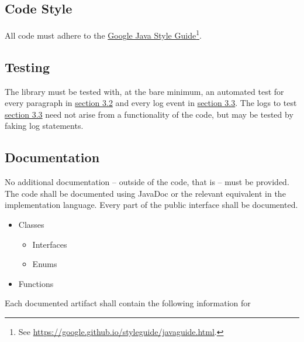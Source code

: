 \documentclass[11pt]{article} %
\begin{document}
    \subsection{Code Style}\label{sec:3.4}

    All code must adhere to the \href{https://google.github.io/styleguide/javaguide.html}{Google Java Style Guide}\footnote{See \url{https://google.github.io/styleguide/javaguide.html}.}.

    \subsection{Testing}\label{sec:3.5}

    The library must be tested with, at the bare minimum, an automated test for every paragraph in \hyperref[sec:3.2]{section 3.2} and every log event in \hyperref[sec:3.3]{section 3.3}. The logs to test \hyperref[sec:3.3]{section 3.3} need not arise from a functionality of the code, but may be tested by faking log statements.

    \subsection{Documentation}\label{sec:3.6}

    No additional documentation -- outside of the code, that is -- must be provided. The code shall be documented using JavaDoc or the relevant equivalent in the implementation language. Every part of the public interface shall be documented.

    \begin{itemize}
        \item Classes
        \begin{itemize}
            \item Interfaces
            \item Enums
        \end{itemize}
        \item Functions
    \end{itemize}

    Each documented artifact shall contain the following information for
\end{document}

